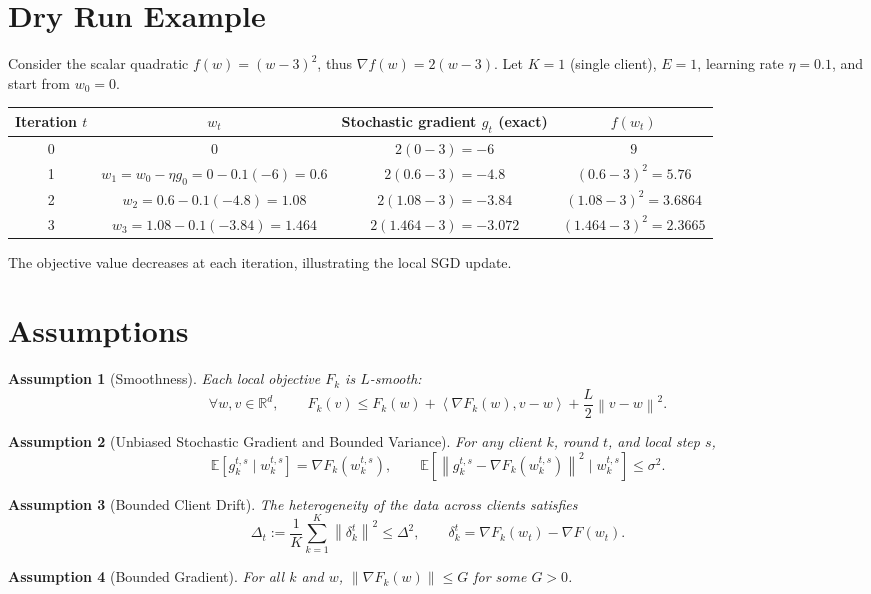 \documentclass{article}
\newtheorem{assumption}{Assumption}
\newcommand{\EE}{\mathbb{E}}
\newcommand{\RR}{\mathbb{R}}
\newcommand{\norm}[1]{\left\|#1\right\|}
\newcommand{\inner}[2]{\left\langle #1,#2\right\rangle}
\newcommand{\grad}{\nabla}
\begin{document}
\section*{Dry Run Example}
Consider the scalar quadratic $f(w)=(w-3)^2$, thus $\grad f(w)=2(w-3)$.
Let $K=1$ (single client), $E=1$, learning rate $\eta=0.1$, and start from $w_0=0$.

\begin{center}
\begin{tabular}{c|c|c|c}
Iteration $t$ & $w_t$ & Stochastic gradient $g_t$ (exact) & $f(w_t)$\\\hline
0 & $0$ & $2(0-3)=-6$ & $9$\\
1 & $w_1 = w_0-\eta g_0 = 0-0.1(-6)=0.6$ & $2(0.6-3)=-4.8$ & $(0.6-3)^2=5.76$\\
2 & $w_2 = 0.6-0.1(-4.8)=1.08$ & $2(1.08-3)=-3.84$ & $(1.08-3)^2=3.6864$\\
3 & $w_3 = 1.08-0.1(-3.84)=1.464$ & $2(1.464-3)=-3.072$ & $(1.464-3)^2=2.3665$
\end{tabular}
\end{center}
The objective value decreases at each iteration, illustrating the local SGD update.

\newpage

\section*{Assumptions}
\begin{assumption}[Smoothness]\label{ass:smooth}
Each local objective $F_k$ is $L$-smooth:
\[
\forall w,v\in\RR^d,\qquad
F_k(v)\le F_k(w)+\inner{\grad F_k(w)}{v-w}+\frac{L}{2}\norm{v-w}^2 .
\]
\end{assumption}
\begin{assumption}[Unbiased Stochastic Gradient and Bounded Variance]\label{ass:sgd}
For any client $k$, round $t$, and local step $s$,
\[
\EE\!\left[g_{k}^{t,s}\mid w_{k}^{t,s}\right]=\grad F_k\!\left(w_{k}^{t,s}\right),\qquad
\EE\!\left[\norm{g_{k}^{t,s}-\grad F_k(w_{k}^{t,s})}^{2}\mid w_{k}^{t,s}\right]\le\sigma^{2}.
\]
\end{assumption}
\begin{assumption}[Bounded Client Drift]\label{ass:drift}
The heterogeneity of the data across clients satisfies
\[
\Delta_t:=\frac{1}{K}\sum_{k=1}^{K}\norm{\delta_k^{t}}^{2}\le \Delta^{2},
\qquad
\delta_k^{t}=\grad F_k(w_t)-\grad F(w_t).
\]
\end{assumption}
\begin{assumption}[Bounded Gradient]\label{ass:grad}
For all $k$ and $w$, $\norm{\grad F_k(w)}\le G$ for some $G>0$.
\end{assumption}
\end{document}
